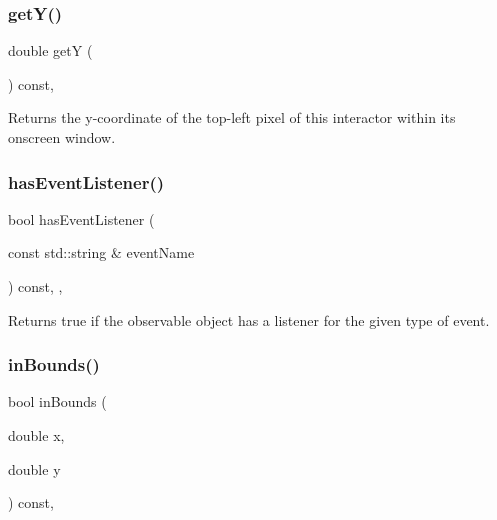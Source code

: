 \subsubsection{\texorpdfstring{get\+Y()}{getY()}}
{\footnotesize\ttfamily double getY (\begin{DoxyParamCaption}{ }\end{DoxyParamCaption}) const\hspace{0.3cm}{\ttfamily [virtual]}, {\ttfamily [inherited]}}



Returns the y-\/coordinate of the top-\/left pixel of this interactor within its onscreen window. 

\mbox{\label{classsgl_1_1GObservable_a9f6faaa25942923bafa1c44020c49fa9}} 
\subsubsection{\texorpdfstring{has\+Event\+Listener()}{hasEventListener()}}
{\footnotesize\ttfamily bool has\+Event\+Listener (\begin{DoxyParamCaption}\item[{const std\+::string \&}]{event\+Name }\end{DoxyParamCaption}) const\hspace{0.3cm}{\ttfamily [protected]}, {\ttfamily [virtual]}, {\ttfamily [inherited]}}



Returns true if the observable object has a listener for the given type of event. 

\mbox{\label{classsgl_1_1GInteractor_afc480f652b8c5f1fb255e2269ce68879}} 
\subsubsection{\texorpdfstring{in\+Bounds()}{inBounds()}\hspace{0.1cm}{\footnotesize\ttfamily [1/2]}}
{\footnotesize\ttfamily bool in\+Bounds (\begin{DoxyParamCaption}\item[{double}]{x,  }\item[{double}]{y }\end{DoxyParamCaption}) const\hspace{0.3cm}{\ttfamily [virtual]}, {\ttfamily [inherited]}}



